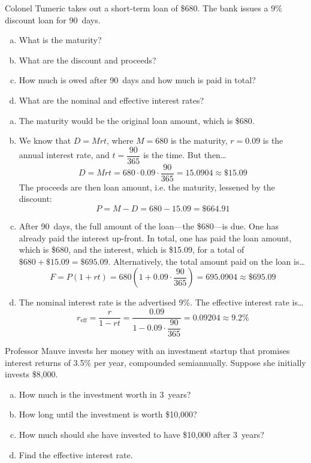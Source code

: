 \documentclass[11pt,letterpaper]{article}
\begin{document}
\newpage



 Colonel Tumeric takes out a short-term loan of \$680. The bank issues a 9\% discount loan for 90~days.
	\begin{enumerate}[(a)]
	\item What is the maturity?
	\item What are the discount and proceeds?
	\item How much is owed after 90~days and how much is paid in total?
	\item What are the nominal and effective interest rates?
	\end{enumerate} \pspace

\sol
\begin{enumerate}[(a)]
\item The maturity would be the original loan amount, which is \$680. \pspace

\item We know that $D= Mrt$, where $M= 680$ is the maturity, $r= 0.09$ is the annual interest rate, and $t= \dfrac{90}{365}$ is the time. But then\dots
	\[
	D= Mrt= 680 \cdot 0.09 \cdot \dfrac{90}{365}= 15.0904 \approx \$15.09
	\]
The proceeds are then loan amount, i.e. the maturity, lessened by the discount:
	\[
	P= M - D= 680 - 15.09= \$664.91 
	\] \pspace

\item After 90~days, the full amount of the loan---the \$680---is due. One has already paid the interest up-front. In total, one has paid the loan amount, which is \$680, and the interest, which is \$15.09, for a total of $\$680 + \$15.09= \$695.09$. Alternatively, the total amount paid on the loan is\dots
	\[
	F= P(1 + rt)= 680 \left(1 + 0.09 \cdot \dfrac{90}{365} \right)= 695.0904 \approx \$695.09
	\] \pspace

\item The nominal interest rate is the advertised 9\%. The effective interest rate is\dots
	\[
	r_{\text{eff}}= \dfrac{r}{1 - rt}= \dfrac{0.09}{1 - 0.09 \cdot \dfrac{90}{365}}= 0.09204 \approx 9.2\%
	\]
\end{enumerate}



\newpage



 Professor Mauve invests her money with an investment startup that promises interest returns of 3.5\% per year, compounded semiannually. Suppose she initially invests \$8,000.  
	\begin{enumerate}[(a)]
	\item How much is the investment worth in 3~years?
	\item How long until the investment is worth \$10,000?
	\item How much should she have invested to have \$10,000 after 3~years?
	\item Find the effective interest rate.
	\end{enumerate} \pspace
\end{document}
